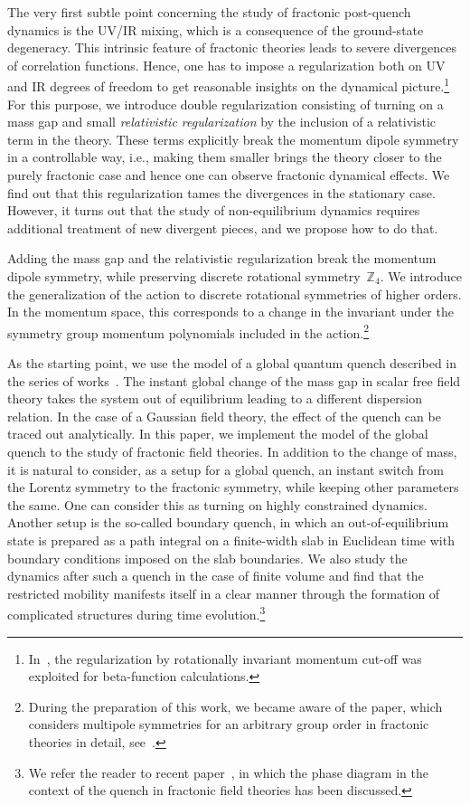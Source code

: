\documentclass[a4paper,12pt]{article}
\newcommand{\Z}[1]{\mathbb{Z}_{#1}}
\begin{document}
The very first subtle point concerning the study of fractonic post-quench dynamics is the UV/IR mixing, which is a consequence of the ground-state degeneracy. This intrinsic feature of fractonic theories leads to severe divergences of correlation functions. Hence, one has to impose a regularization both on UV and IR degrees of freedom to get reasonable insights on the dynamical picture.\footnote{In~\cite{Distler:2021bop}, the regularization by rotationally invariant momentum cut-off was exploited for beta-function calculations.} For this purpose, we introduce double regularization consisting of turning on a mass gap and small \emph{relativistic regularization} by the inclusion of a relativistic term in the theory. These terms explicitly break the momentum dipole symmetry in a controllable way, i.e., making them smaller brings the theory closer to the purely fractonic case and hence one can observe fractonic dynamical effects. We find out that this regularization tames the divergences in the stationary case. However, it turns out that the study of non-equilibrium dynamics requires additional treatment of new divergent pieces, and we propose how to do that.

Adding the mass gap and the relativistic regularization break the momentum dipole symmetry, while preserving discrete rotational symmetry~$\Z4$. We introduce the generalization of the action to discrete rotational symmetries of higher orders. In the momentum space, this corresponds to a change in the invariant under the symmetry group momentum polynomials included in the action.\footnote{During the preparation of this work, we became aware of the paper, which considers multipole symmetries for an arbitrary group order in fractonic theories in detail, see~\cite{Bulmash:2023msp}.}

As the starting point, we use the model of a global quantum quench described in the series of works~\cite{Calabrese:2007rg, Sotiriadis2009thermal, Sotiriadis:2010si}. The instant global change of the mass gap in scalar free field theory takes the system out of equilibrium leading to a different dispersion relation. In the case of a Gaussian field theory, the effect of the quench can be traced out analytically. In this paper, we implement the model of the global quench to the study of fractonic field theories. In addition to the change of mass, it is natural to consider, as a setup for a global quench, an instant switch from the Lorentz symmetry to the fractonic symmetry, while keeping other parameters the same. One can consider this as turning on highly constrained dynamics. Another setup is the so-called boundary quench, in which an out-of-equilibrium state is prepared as a path integral on a finite-width slab in Euclidean time with boundary conditions imposed on the slab boundaries. We also study the dynamics after such a quench in the case of finite volume and find that the restricted mobility manifests itself in a clear manner through the formation of complicated structures during time evolution.\footnote{We refer the reader to recent paper~\cite{Islam:2023cmm}, in which the phase diagram in the context of the quench in fractonic field theories has been discussed.}
\end{document}
